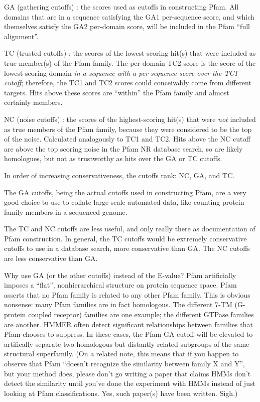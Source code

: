 \begin{wideitem}
\item[GA (gathering cutoffs)]: the scores used as cutoffs in
constructing Pfam. All domains that are in a sequence satisfying the
GA1 per-sequence score, and which themselves satisfy the GA2
per-domain score, will be included in the Pfam ``full alignment''.

\item[TC (trusted cutoffs)]: the scores of the lowest-scoring hit(s)
that were included as true member(s) of the Pfam family. The
per-domain TC2 score is the score of the lowest scoring domain
\textit{in a sequence with a per-sequence score over the TC1 cutoff};
therefore, the TC1 and TC2 scores could conceivably come from
different targets. Hits above these scores are ``within'' the Pfam
family and almost certainly members.

\item[NC (noise cutoffs)]: the scores of the highest-scoring
hit(s) that were \textit{not} included as true members of the Pfam
family, because they were considered to be the top of the noise.
Calculated analogously to TC1 and TC2. Hits above the NC cutoff are
above the top scoring noise in the Pfam NR database search, so are
likely homologues, but not as trustworthy as hits over the GA or TC
cutoffs.
\end{wideitem}

In order of increasing conservativeness, the cutoffs rank: NC, GA, and
TC.

The GA cutoffs, being the actual cutoffs used in constructing Pfam,
are a very good choice to use to collate large-scale automated data,
like counting protein family members in a sequenced genome.

The TC and NC cutoffs are less useful, and only really there as
documentation of Pfam construction. In general, the TC cutoffs would
be extremely conservative cutoffs to use in a database search, more
conservative than GA. The NC cutoffs are less conservative than GA.

Why use GA (or the other cutoffs) instead of the E-value? Pfam
artificially imposes a ``flat'', nonhierarchical structure on protein
sequence space.  Pfam asserts that no Pfam family is related to any
other Pfam family. This is obvious nonsense: many Pfam families are in
fact homologous.  The different 7-TM (G-protein coupled receptor)
families are one example; the different GTPase families are
another. HMMER often detect significant relationships between families
that Pfam chooses to suppress. In these cases, the Pfam GA cutoff will
be elevated to artifically separate two homologous but distantly
related subgroups of the same structural superfamily. (On a related
note, this means that if you happen to observe that Pfam ``doesn't
recognize the similarity between family X and Y'', but your method
does, please don't go writing a paper that claims HMMs don't detect
the similarity until you've done the experiment with HMMs instead of
just looking at Pfam classifications. Yes, such paper(s) have been
written. Sigh.)

